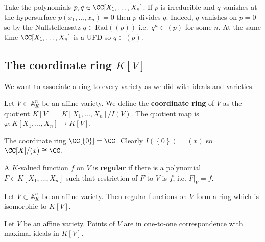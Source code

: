 \documentclass[12pt, a4paper]{article}
\renewcommand{\AA}{\mathbb A}
\begin{document}
\begin{mdexample}
    Take the polynomials \(p, q\in \CC[X_1,\ldots,X_n]\). If \(p\) is irreducible and \(q\) vanishes at the hypersurface \(p(x_1,\ldots,x_n)=0\) then \(p\) divides \(q\). Indeed, \(q\) vanishes on \(p=0\) so by the Nullstellensatz \(q\in \text{Rad}((p))\) i.e.\ \(q^n \in (p)\) for some \(n\). At the same time \(\CC[X_1,\ldots,X_n]\) is a UFD so \(q\in (p)\).
\end{mdexample}

\subsection{The coordinate ring \texorpdfstring{\(K[V]\)}{TEXT}}

\begin{mdnote}
    We want to associate a ring to every variety as we did with ideals and varieties.
\end{mdnote}

\begin{definition}
    Let \(V \subset \AA_K^n\) be an affine variety. We define the \textbf{coordinate ring} of \(V\) as the quotient \(K[V] = K[X_1,\ldots,X_n]/I(V)\). The quotient map is \(\varphi : K[X_1,\ldots,X_n] \to K[V]\).
\end{definition}

\begin{mdexample}
    The coordinate ring \(\CC[\left\{ 0 \right\}]= \CC\). Clearly \(I(\left\{ 0 \right\}) = (x)\) so \(\CC[X]/(x)\cong \CC\).
\end{mdexample}

\begin{definition}
    A \(K\)-valued function \(f\) on \(V\) is \textbf{regular} if there is a polynomial \(F \in K[X_1,\ldots,X_n]\) such that restriction of \(F\) to \(V\) is \(f\), i.e. \(F\vert_V =f\).
\end{definition}

\begin{proposition}
    Let \(V \subset \AA_K^n\) be an affine variety. Then regular functions on \(V\) form a ring which is isomorphic to \(K[V]\).
\end{proposition}

\begin{mdprop}
    Let \(V\) be an affine variety. Points of \(V\) are in one-to-one correspondence with maximal ideals in \(K[V]\).
\end{mdprop}
\end{document}
